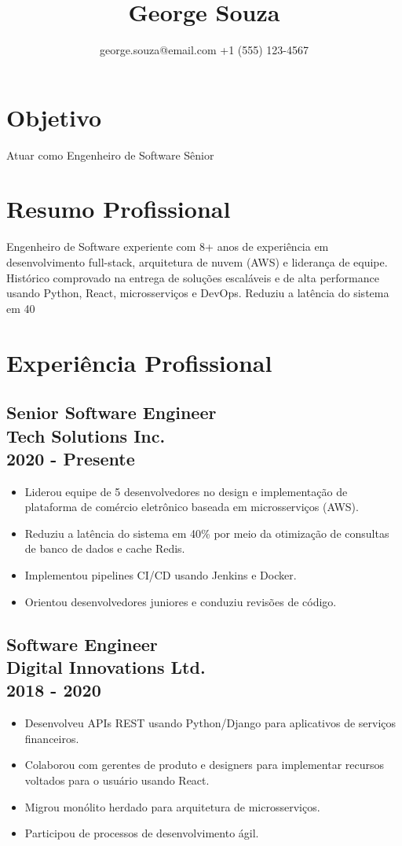 \documentclass{article}
\title{George Souza}
\author{george.souza@email.com \hspace{1cm} +1 (555) 123-4567}
\begin{document}
\maketitle

\section*{Objetivo}
Atuar como Engenheiro de Software Sênior

\section*{Resumo Profissional}
Engenheiro de Software experiente com 8+ anos de experiência em desenvolvimento full-stack, arquitetura de nuvem (AWS) e liderança de equipe. Histórico comprovado na entrega de soluções escaláveis e de alta performance usando Python, React, microsserviços e DevOps.  Reduziu a latência do sistema em 40%

\section*{Experiência Profissional}
\subsection*{Senior Software Engineer \\ Tech Solutions Inc. \\ 2020 - Presente}
\begin{itemize}
    \item Liderou equipe de 5 desenvolvedores no design e implementação de plataforma de comércio eletrônico baseada em microsserviços (AWS).
    \item Reduziu a latência do sistema em 40\% por meio da otimização de consultas de banco de dados e cache Redis.
    \item Implementou pipelines CI/CD usando Jenkins e Docker.
    \item Orientou desenvolvedores juniores e conduziu revisões de código.
\end{itemize}
\subsection*{Software Engineer \\ Digital Innovations Ltd. \\ 2018 - 2020}
\begin{itemize}
    \item Desenvolveu APIs REST usando Python/Django para aplicativos de serviços financeiros.
    \item Colaborou com gerentes de produto e designers para implementar recursos voltados para o usuário usando React.
    \item Migrou monólito herdado para arquitetura de microsserviços.
    \item Participou de processos de desenvolvimento ágil.
\end{itemize}
\end{document}
